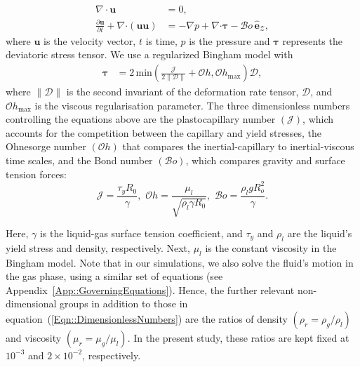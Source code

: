 \documentclass[final]{jfm}
\begin{document}
\begin{align}
\nabla \cdot \boldsymbol{u}&=0,\label{Eqn::FinalFormLiqContinuity}\\
	\frac{\partial\boldsymbol{u}}{\partial t} + \nabla\boldsymbol{\cdot}\left(\boldsymbol{uu}\right) &= -\nabla p + \nabla\boldsymbol{\cdot}\boldsymbol{\tau} - \mathcal{B}o\,\hat{\boldsymbol{e}}_{\boldsymbol{\mathcal{Z}}}\label{Eqn::FinalFormLiqNS},
\end{align}
%
where $\boldsymbol{u}$ is the velocity vector, $t$ is time, $p$ is the pressure and $\boldsymbol{\tau}$ represents the deviatoric stress tensor. We use a regularized Bingham model with
\begin{align}
    \boldsymbol{\tau} &= 2\,\text{min}\left(\frac{\mathcal{J}}{2\|\boldsymbol{\mathcal{D}}\|} + \mathcal{O}h, \mathcal{O}h_\text{max}\right)\boldsymbol{\mathcal{D}},\label{Eqn::RegularizedForm}
\end{align}
%
where $\|\boldsymbol{\mathcal{D}}\|$ is the second invariant of the deformation rate tensor, $\boldsymbol{\mathcal{D}}$, and $\mathcal{O}h_{\text{max}}$ is the viscous regularisation parameter. The three dimensionless numbers controlling the equations above are the plastocapillary number $\left(\mathcal{J}\right)$, which accounts for the competition between the capillary and yield stresses, the Ohnesorge number $\left(\mathcal{O}h\right)$ that compares the inertial-capillary to inertial-viscous time scales, and the Bond number $\left(\mathcal{B}o\right)$, which compares gravity and surface tension forces:
\begin{equation}\label{Eqn::DimensionlessNumbers}
	\mathcal{J} = \frac{\tau_yR_0}{\gamma},\,\,\mathcal{O}h = \frac{\mu_l}{\sqrt{\rho_l\gamma R_0}},\,\,\mathcal{B}o = \frac{\rho_l gR_o^2}{\gamma}.
\end{equation}

\noindent Here, $\gamma$ is the liquid-gas surface tension coefficient, and $\tau_y$ and $\rho_l$ are the liquid's yield stress and density, respectively. Next, $\mu_l$ is the constant viscosity in the Bingham model. Note that in our simulations, we also solve the fluid's motion in the gas phase, using a similar set of equations (see Appendix~\ref{App::GoverningEquations}). Hence, the further relevant non-dimensional groups in addition to those in equation~(\ref{Eqn::DimensionlessNumbers}) are the ratios of density $\left(\rho_r = \rho_g/\rho_l\right)$ and viscosity $\left(\mu_r = \mu_g/\mu_l\right)$. In the present study, these ratios are kept fixed at $10^{-3}$ and $2 \times 10^{-2}$, respectively. 
\end{document}
